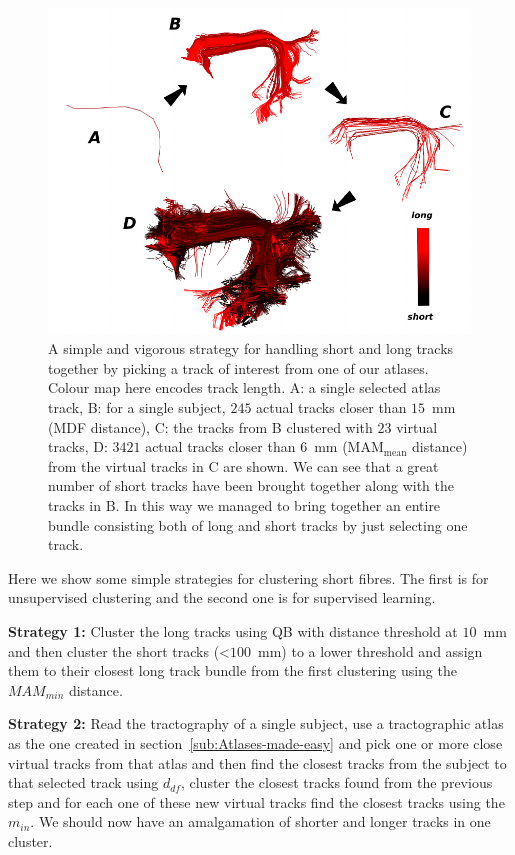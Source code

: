\documentclass[preprint,authoryear,a4paper,10pt,onecolumn]{elsarticle}
\begin{document}
%
\begin{figure}
\begin{centering}
\includegraphics[scale=0.7]{Fig_10_arcuate_small_fibers}
\par\end{centering}
\caption{A simple and vigorous strategy for handling short and long
  tracks together by picking a track of interest from one of our
  atlases. Colour map here encodes track length. A: a single selected
  atlas track, B: for a single subject, $245$ actual tracks closer than
  $15$~mm (MDF distance), C: the tracks from B clustered with $23$
  virtual tracks, D: $3421$ actual tracks closer than $6$~mm
  ($\textrm{MAM}_{\textrm{mean}}$ distance) from the virtual tracks in C
  are shown. We can see that a great number of short tracks have been
  brought together along with the tracks in B. In this way we managed to
  bring together an entire bundle consisting both of long and short
  tracks by just selecting one track.\label{Flo:arcuate_close}}
\end{figure}

Here we show some simple strategies for clustering short fibres. The first
is for unsupervised clustering and the second one is for supervised
learning.

\textbf{Strategy 1:} Cluster the long tracks using QB with distance
threshold at $10$~mm and then cluster the short tracks (<$100$~mm) to a
lower threshold and assign them to their closest long track bundle from
the first clustering using the $MAM_{min}$ distance.

\textbf{Strategy 2:} Read the tractography of a single subject, use a
tractographic atlas as the one created in
section~\ref{sub:Atlases-made-easy} and pick one or more close virtual
tracks from that atlas and then find the closest tracks from the subject
to that selected track using $d_{df}$, cluster the closest tracks found
from the previous step and for each one of these new virtual tracks find
the closest tracks using the $m_{in}$. We should now have an
amalgamation of shorter and longer tracks in one cluster.
\end{document}
